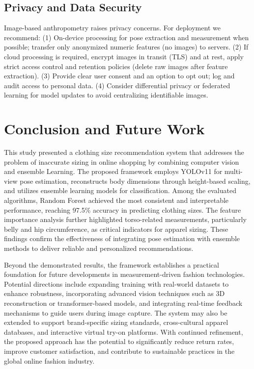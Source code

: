 \documentclass{llncs}
\begin{document}
\subsection{Privacy and Data Security}

Image-based anthropometry raises privacy concerns. For deployment we recommend: (1) On-device processing for pose extraction and measurement when possible; transfer only anonymized numeric features (no images) to servers.
(2) If cloud processing is required, encrypt images in transit (TLS) and at rest, apply strict access control and retention policies (delete raw images after feature extraction).
(3) Provide clear user consent and an option to opt out; log and audit access to personal data.
(4) Consider differential privacy or federated learning for model updates to avoid centralizing identifiable images.

\section{Conclusion and Future Work}

This study presented a clothing size recommendation system that addresses the problem of inaccurate sizing in online shopping by combining computer vision and ensemble Learning. 
The proposed framework employs YOLOv11 for multi-view pose estimation, reconstructs body dimensions through height-based scaling, and utilizes ensemble learning models for classification. 
Among the evaluated algorithms, Random Forest achieved the most consistent and interpretable performance, reaching 97.5\% accuracy in predicting clothing sizes. 
The feature importance analysis further highlighted torso-related measurements, particularly belly and hip circumference, as critical indicators for apparel sizing. 
These findings confirm the effectiveness of integrating pose estimation with ensemble methods to deliver reliable and personalized recommendations.

Beyond the demonstrated results, the framework establishes a practical foundation for future developments in measurement-driven fashion technologies. 
Potential directions include expanding training with real-world datasets to enhance robustness, incorporating advanced vision techniques such as 3D reconstruction or transformer-based models, 
    and integrating real-time feedback mechanisms to guide users during image capture. The system may also be extended to support brand-specific sizing standards, cross-cultural apparel databases, 
    and interactive virtual try-on platforms. 
With continued refinement, the proposed approach has the potential to significantly reduce return rates, improve customer satisfaction, and contribute to sustainable practices in the global online fashion industry.
\end{document}
